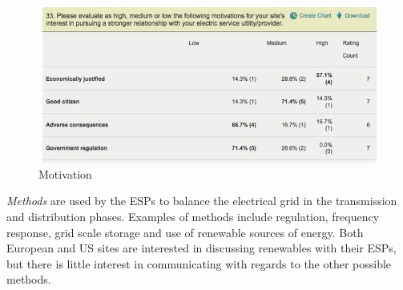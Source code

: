 \begin{figure}
\begin{center}
\includegraphics[scale=0.5]{figs/Table2.jpg}
\caption{Motivation}
\label{fig:table2}
\end{center}
\end{figure}

\emph{Methods} are used by the ESPs to balance the electrical grid in the transmission and distribution phases. Examples of methods include regulation, frequency response, grid scale storage and use of renewable sources of energy. Both European and US sites are interested in discussing renewables with their ESPs, but there is little interest in communicating with regards to the other possible methods.
